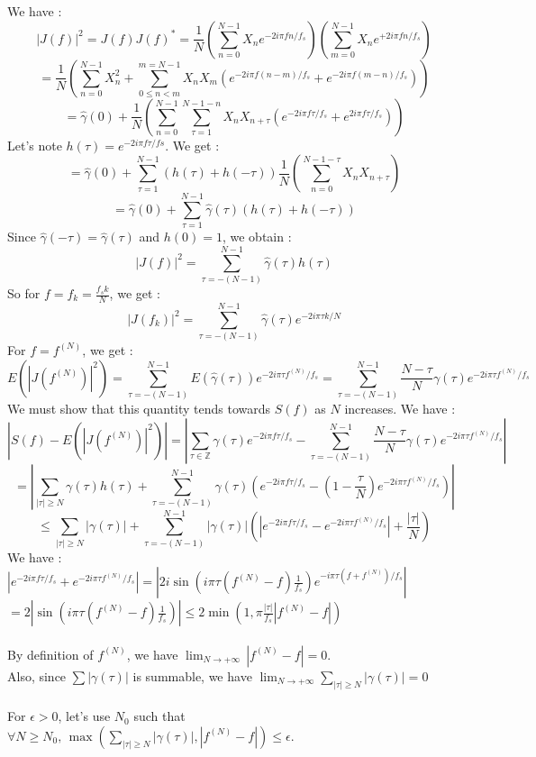 \documentclass[11pt]{article}
\begin{document}
\begin{solution}


    We have :
    $$|J(f)|^2 = J(f)J(f)^* = \frac{1}{N}(\sum_{n=0}^{N-1}X_ne^{-2i\pi fn/f_s})(\sum_{m=0}^{N-1}X_ne^{+2i\pi fn/f_s})$$
    $$=\frac{1}{N}(\sum_{n=0}^{N-1} X_n^2+\sum_{0\leq n<m}^{m=N-1}X_nX_m(e^{-2i\pi f(n-m)/f_s}+e^{-2i\pi f(m-n)/f_s}))$$
    $$=\hat{\gamma}(0)+\frac{1}{N}(\sum_{n=0}^{N-1}\sum_{\tau=1}^{N-1-n}X_nX_{n+\tau}(e^{-2i\pi f\tau/f_s}+e^{2i\pi f\tau/f_s}))$$
    Let's note $h(\tau) = e^{-2i\pi f \tau/fs}$. We get :
    $$=\hat{\gamma}(0)+\sum_{\tau=1}^{N-1}(h(\tau)+h(-\tau))\frac{1}{N}(\sum_{n=0}^{N-1-\tau}X_nX_{n+\tau})$$
    $$=\hat{\gamma}(0)+\sum_{\tau=1}^{N-1}\hat{\gamma}(\tau)(h(\tau)+h(-\tau))$$
    Since $\hat{\gamma}(-\tau) = \hat{\gamma}(\tau)$ and $h(0)=1$, we obtain :
    $$|J(f)|^2 =\sum_{\tau=-(N-1)}^{N-1}\hat{\gamma}(\tau)h(\tau)$$
    So for $f=f_k=\frac{f_sk}{N}$, we get :
    $$|J(f_k)|^2 = \sum_{\tau=-(N-1)}^{N-1}\hat{\gamma}(\tau)e^{-2i\pi \tau k/N} $$
    For $f = f^{(N)}$, we get :
    $$E(|J(f^{(N)})|^2) = \sum_{\tau=-(N-1)}^{N-1}E(\hat{\gamma}(\tau))e^{-2i\pi \tau f^{(N)}/ f_s}=\sum_{\tau=-(N-1)}^{N-1}\frac{N-\tau}{N}\gamma(\tau)e^{-2i\pi \tau f^{(N)}/ f_s} $$
    We must show that this quantity tends towards $S(f)$ as $N$ increases. We have :
    $$|S(f)-E(|J(f^{(N)})|^2)| = |\sum_{\tau \in \mathbb{Z}} \gamma(\tau)e^{-2i\pi f\tau/f_s}-\sum_{\tau=-(N-1)}^{N-1} \frac{N-\tau}{N}\gamma(\tau)e^{-2i\pi \tau f^{(N)}/f_s}|  $$
    $$= |\sum_{|\tau|\geq N} \gamma(\tau)h(\tau)+\sum_{\tau=-(N-1)}^{N-1} \gamma(\tau)(e^{-2i\pi f\tau/f_s}-(1-\frac{\tau}{N})e^{-2i\pi\tau f^{(N)}/f_s})|$$
    $$\leq \sum_{|\tau|\geq N} |\gamma(\tau)|+\sum_{\tau=-(N-1)}^{N-1} |\gamma(\tau)|(|e^{-2i\pi f\tau/f_s}-e^{-2i\pi\tau f^{(N)}/f_s}|+\frac{|\tau|}{N})$$
    We have : $|e^{-2i\pi f\tau/f_s}+e^{-2i\pi\tau f^{(N)}/f_s}| = |2i\sin(i\pi\tau(f^{(N)}-f)\frac{1}{f_s})e^{-i\pi\tau(f+f^{(N)})/f_s}|$\\
    $= 2|\sin(i\pi\tau(f^{(N)}-f)\frac{1}{f_s})|\leq 2\min(1,\pi\frac{|\tau|}{f_s}|f^{(N)}-f|)$\\ \\
    By definition of $f^{(N)}$, we have $\lim_{N\rightarrow +\infty} \, |f^{(N)}-f|=0$. \\
    Also, since $\sum |\gamma(\tau)|$ is summable, we have $\lim_{N\rightarrow +\infty}\sum_{|\tau|\geq N}|\gamma(\tau)|=0$\\ \\
    For $\epsilon>0$, let's use $N_0$ such that $\forall N \geq N_0,\, \max(\sum_{|\tau|\geq N}|\gamma(\tau)|,|f^{(N)}-f|) \leq \epsilon$.

\end{solution}
\end{document}
